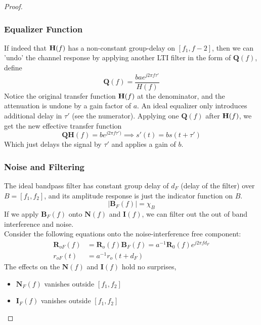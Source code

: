 \documentclass[../../main.tex]{subfiles}
\begin{document}
\begin{proof}
\subsubsection*{Equalizer Function}
If indeed that $\mathbf{H}(f)$ has a non-constant group-delay on $[f_1,f-2]$, then we can 'undo' the channel response by applying another LTI filter in the form of $\mathbf{Q}(f)$, define
\[
\mathbf{Q}(f) = \dfrac{bae^{j2\pi f\tau'}}{H(f)}
\]
Notice the original transfer function $\mathbf{H}(f)$ at the denominator, and the attenuation is undone by a gain factor of $a$. An ideal equalizer only introduces additional delay in $\tau'$ (see the numerator). Applying one $\mathbf{Q}(f)$ after $\mathbf{H}(f)$, we get the new effective transfer function
\[
\mathbf{Q}\mathbf{H}(f) = be^{j2\pi f\tau')}\implies s'(t) = bs(t+\tau')
\]
Which just delays the signal by $\tau'$ and applies a gain of $b$.
\subsubsection*{Noise and Filtering}
The ideal bandpass filter has constant group delay of $d_F$ (delay of the filter) over $B=[f_1,f_2]$, and its amplitude response is just the indicator function on $B$.
\[
|\mathbf{B}_F(f)| = \chi_B
\]
If we apply $\mathbf{B}_F(f)$ onto $\mathbf{N}(f)$ and $\mathbf{I}(f)$, we can filter out the out of band interference and noise. \\

Consider the following equations onto the noise-interference free component:
\begin{align}
    \mathbf{R}_{oF}(f) &= \mathbf{R}_o(f)\mathbf{B}_F(f) =a^{-1}\mathbf{R}_0(f)e^{j2\pi f d_F}\\[2ex]
    r_{oF}(t) &= a^{-1}r_o(t + d_F)\label{filter introduces additional delay}
\end{align}
The effects on the $\mathbf{N}(f)$ and $\mathbf{I}(f)$ hold no surprises,
\begin{itemize}
    \item $\mathbf{N}_F(f)$ vanishes outside $[f_1,f_2]$
    \item $\mathbf{I}_F(f)$ vanishes outside $[f_1,f_2]$
\end{itemize}
\begin{wtr}

\end{wtr}
\end{proof}
\end{document}
